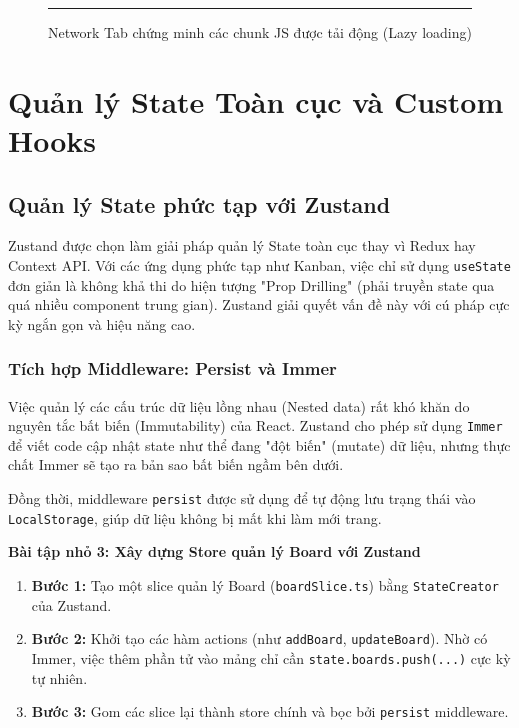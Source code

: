 \begin{figure}[H]
    \centering
    \rule{0.8\textwidth}{0.4\textwidth}
    \caption{Network Tab chứng minh các chunk JS được tải động (Lazy loading)}
\end{figure}

\chapter{Quản lý State Toàn cục và Custom Hooks}

\section{Quản lý State phức tạp với Zustand}
Zustand được chọn làm giải pháp quản lý State toàn cục thay vì Redux hay Context API. Với các ứng dụng phức tạp như Kanban, việc chỉ sử dụng \texttt{useState} đơn giản là không khả thi do hiện tượng "Prop Drilling" (phải truyền state qua quá nhiều component trung gian). Zustand giải quyết vấn đề này với cú pháp cực kỳ ngắn gọn và hiệu năng cao.

\subsection{Tích hợp Middleware: Persist và Immer}
Việc quản lý các cấu trúc dữ liệu lồng nhau (Nested data) rất khó khăn do nguyên tắc bất biến (Immutability) của React. Zustand cho phép sử dụng \texttt{Immer} để viết code cập nhật state như thể đang "đột biến" (mutate) dữ liệu, nhưng thực chất Immer sẽ tạo ra bản sao bất biến ngầm bên dưới.

Đồng thời, middleware \texttt{persist} được sử dụng để tự động lưu trạng thái vào \texttt{LocalStorage}, giúp dữ liệu không bị mất khi làm mới trang.

\textbf{Bài tập nhỏ 3: Xây dựng Store quản lý Board với Zustand}
\begin{enumerate}
    \item \textbf{Bước 1:} Tạo một slice quản lý Board (\texttt{boardSlice.ts}) bằng \texttt{StateCreator} của Zustand.
    \item \textbf{Bước 2:} Khởi tạo các hàm actions (như \texttt{addBoard}, \texttt{updateBoard}). Nhờ có Immer, việc thêm phần tử vào mảng chỉ cần \texttt{state.boards.push(...)} cực kỳ tự nhiên.
    \item \textbf{Bước 3:} Gom các slice lại thành store chính và bọc bởi \texttt{persist} middleware.
\end{enumerate}

